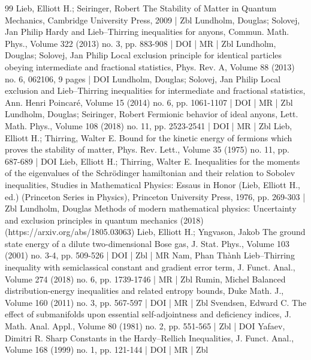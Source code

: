 \begin{thebibliography}{99}
Lieb, Elliott H.; Seiringer, Robert The Stability of Matter in Quantum Mechanics, Cambridge University Press, 2009 | Zbl
Lundholm, Douglas; Solovej, Jan Philip Hardy and Lieb–Thirring inequalities for anyons, Commun. Math. Phys., Volume 322 (2013) no. 3, pp. 883-908 | DOI | MR | Zbl
Lundholm, Douglas; Solovej, Jan Philip Local exclusion principle for identical particles obeying intermediate and fractional statistics, Phys. Rev. A, Volume 88 (2013) no. 6, 062106, 9 pages | DOI
Lundholm, Douglas; Solovej, Jan Philip Local exclusion and Lieb–Thirring inequalities for intermediate and fractional statistics, Ann. Henri Poincaré, Volume 15 (2014) no. 6, pp. 1061-1107 | DOI | MR | Zbl
Lundholm, Douglas; Seiringer, Robert Fermionic behavior of ideal anyons, Lett. Math. Phys., Volume 108 (2018) no. 11, pp. 2523-2541 | DOI | MR | Zbl
Lieb, Elliott H.; Thirring, Walter E. Bound for the kinetic energy of fermions which proves the stability of matter, Phys. Rev. Lett., Volume 35 (1975) no. 11, pp. 687-689 | DOI
Lieb, Elliott H.; Thirring, Walter E. Inequalities for the moments of the eigenvalues of the Schrödinger hamiltonian and their relation to Sobolev inequalities, Studies in Mathematical Physics: Essaus in Honor (Lieb, Elliott H., ed.) (Princeton Series in Physics), Princeton University Press, 1976, pp. 269-303 | Zbl
Lundholm, Douglas Methods of modern mathematical physics: Uncertainty and exclusion principles in quantum mechanics (2018) (https://arxiv.org/abs/1805.03063)
Lieb, Elliott H.; Yngvason, Jakob The ground state energy of a dilute two-dimensional Bose gas, J. Stat. Phys., Volume 103 (2001) no. 3-4, pp. 509-526 | DOI | Zbl | MR
Nam, Phan Thành Lieb–Thirring inequality with semiclassical constant and gradient error term, J. Funct. Anal., Volume 274 (2018) no. 6, pp. 1739-1746 | MR | Zbl
Rumin, Michel Balanced distribution-energy inequalities and related entropy bounds, Duke Math. J., Volume 160 (2011) no. 3, pp. 567-597 | DOI | MR | Zbl
Svendsen, Edward C. The effect of submanifolds upon essential self-adjointness and deficiency indices, J. Math. Anal. Appl., Volume 80 (1981) no. 2, pp. 551-565 | Zbl | DOI
Yafaev, Dimitri R. Sharp Constants in the Hardy–Rellich Inequalities, J. Funct. Anal., Volume 168 (1999) no. 1, pp. 121-144 | DOI | MR | Zbl
\end{thebibliography}
